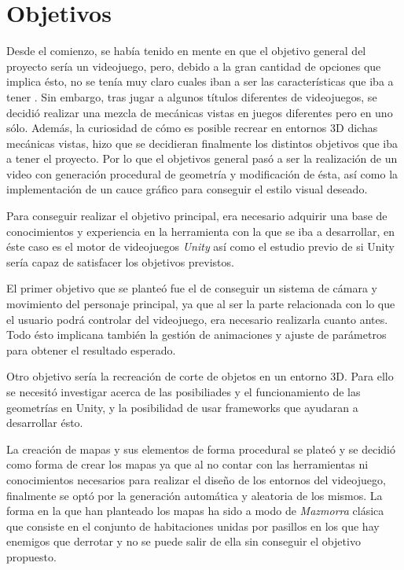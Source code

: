 \chapter{Objetivos}
\label{chap:objetivos}

Desde el comienzo, se había tenido en mente en que el objetivo general del proyecto sería un videojuego, pero, debido a la gran cantidad de opciones que implica ésto, no se tenía muy claro cuales iban a ser las características que iba a tener . Sin embargo, tras jugar a algunos títulos diferentes de videojuegos, se decidió realizar una mezcla de  mecánicas vistas en juegos diferentes pero en uno sólo. Además, la curiosidad de cómo es posible recrear en entornos 3D dichas mecánicas vistas, hizo que se decidieran finalmente los distintos objetivos que iba a tener el proyecto. Por lo que el objetivos general pasó a ser la realización de un video con generación procedural de geometría y modificación de ésta, así como la implementación de un cauce gráfico para conseguir el estilo visual deseado.

Para conseguir realizar el objetivo principal, era necesario adquirir una base de conocimientos y experiencia en la herramienta con la que se iba a desarrollar, en éste caso es el motor de videojuegos \textit{Unity} así como el estudio previo de si Unity sería capaz de satisfacer los objetivos previstos.

El primer objetivo que se planteó fue el de conseguir un sistema de cámara y movimiento del personaje principal, ya que al ser la parte relacionada con lo que el usuario podrá controlar del videojuego, era necesario realizarla cuanto antes. Todo ésto implicana también la gestión de animaciones y ajuste de parámetros para obtener el resultado esperado.

Otro objetivo sería la recreación de corte de objetos en un entorno 3D. Para ello se necesitó investigar acerca de las posibiliades y el funcionamiento de las geometrías en Unity, y la posibilidad de usar frameworks que ayudaran a desarrollar ésto.

La creación de mapas y sus elementos de forma procedural se plateó y se decidió como forma de crear los mapas ya que al no contar con las herramientas ni conocimientos necesarios para realizar el diseño de los entornos del videojuego, finalmente se optó por la generación automática y aleatoria de los mismos. La forma en la que han planteado los mapas ha sido a modo de \textit{Mazmorra} clásica que consiste en el conjunto de habitaciones unidas por pasillos en los que hay enemigos que derrotar y no se puede salir de ella sin conseguir el objetivo propuesto.

